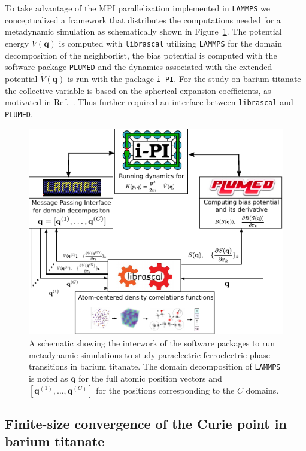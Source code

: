 To take advantage of the MPI parallelization implemented in \texttt{LAMMPS} we conceptualized a framework that distributes the computations needed for a metadynamic simulation as schematically shown in Figure~\ref{fig:ipi-librascal-plumed}.
The potential energy $V(\mathbf{q})$ is computed with \texttt{librascal} utilizing \texttt{LAMMPS} for the domain decomposition of the neighborlist, the bias potential is computed with the software package \texttt{PLUMED} and the dynamics associated with the extended potential $\tilde{V}(\mathbf{q})$ is run with the package \texttt{i-PI}.
For the study on barium titanate the collective variable is based on the spherical expansion coefficients, as motivated in Ref.~\cite{gigli_thermodynamics_2022}.
Thus further required an interface between \texttt{librascal} and \texttt{PLUMED}.

\begin{figure}
    \includegraphics[width=\textwidth]{fig/ipi-librascal-plumed.pdf}
    \caption{A schematic showing the interwork of the software packages to run metadynamic simulations to study paraelectric-ferroelectric phase transitions in barium titanate. The domain decomposition of \texttt{LAMMPS} is noted as $\mathbf{q}$ for the full atomic position vectors and $[\mathbf{q}^{(1)},\ldots, \mathbf{q}^{(C)}]$ for the positions corresponding to the $C$ domains.} 
    \label{fig:ipi-librascal-plumed}
\end{figure}

\subsection{Finite-size convergence of the Curie point in barium titanate}

